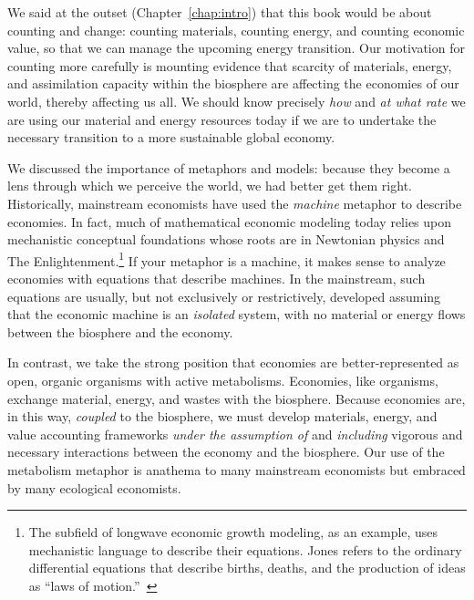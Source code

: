 We said at the outset (Chapter~\ref{chap:intro})
that this book would be about counting and change:
counting materials, counting energy, and counting economic value,
so that we can manage the upcoming energy transition.
Our motivation for counting more carefully
is mounting evidence that 
scarcity of materials, energy, and 
assimilation capacity within the biosphere are affecting
the economies of our world, thereby affecting us all.
We should know precisely \emph{how} and \emph{at what rate} 
we are using our material and energy resources today
if we are to undertake the necessary transition to 
a more sustainable global economy.

We discussed the importance of metaphors and models:
because they become a lens through which we perceive the world,
we had better get them right.
Historically, mainstream economists have used the \emph{machine} metaphor
to describe economies. 
In fact, much of mathematical economic modeling today 
relies upon mechanistic conceptual foundations whose roots 
are in Newtonian physics
and The Enlightenment.\footnote{The subfield 
	of longwave economic growth modeling, as an example, 
	uses mechanistic language to describe their equations. 
	Jones refers to the ordinary differential equations 
	that describe births, deaths, and the production of ideas
	as ``laws of motion.''~\cite[pp.~6 \&~18]{Jones:2001wn} }
If your metaphor is a machine, it makes sense to analyze economies
with equations that describe machines.
In the mainstream, such equations are usually, but not exclusively or restrictively,
developed assuming that the economic machine is an \emph{isolated} system,
with no material or energy flows between the biosphere and the economy.

In contrast, we take the strong position that economies are
better-represented as open, organic organisms with active metabolisms.
Economies, like organisms,
exchange material, energy, and wastes with the biosphere.
Because economies are, in this way, \emph{coupled} to the biosphere,
we must develop materials, energy, and value accounting frameworks
\emph{under the assumption of} and \emph{including} 
vigorous and necessary interactions between
the economy and the biosphere.
Our use of the metabolism metaphor is anathema to many 
mainstream economists but embraced by many ecological economists.

